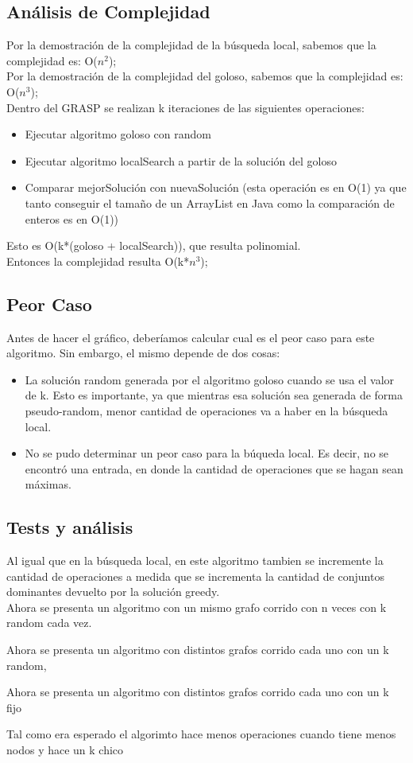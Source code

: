 \subsection{Análisis de Complejidad}
Por la demostración de la complejidad de la búsqueda local, sabemos que la complejidad es: O($n^2$);\\
Por la demostración de la complejidad del goloso, sabemos que la complejidad es: O($n^3$);\\
Dentro del GRASP se realizan k iteraciones de las siguientes operaciones:
\begin{itemize}
\item Ejecutar algoritmo goloso con random
\item Ejecutar algoritmo localSearch a partir de la solución del goloso
\item Comparar mejorSolución con nuevaSolución (esta operación es en O(1) ya que tanto conseguir el tamaño de un ArrayList en Java como la comparación de enteros es en O(1)) 
\end{itemize}
Esto es O(k*(goloso + localSearch)), que resulta polinomial.\\
Entonces la complejidad resulta O(k*$n^3$);

\subsection{Peor Caso}
Antes de hacer el gráfico, deberíamos calcular cual es el peor caso para este algoritmo. Sin embargo, el mismo depende de dos cosas:
\begin{itemize}
\item La solución random generada por el algoritmo goloso cuando se usa el valor de k. 	Esto es importante, ya que mientras esa solución sea generada de forma pseudo-random, menor cantidad
	de operaciones va a haber en la búsqueda local.
\item No se pudo determinar un peor caso para la búqueda local. Es decir, no se encontró una entrada, en donde la
	cantidad de operaciones que se hagan sean máximas.
\end{itemize}

\subsection{Tests y análisis}
Al igual que en la búsqueda local, en este algoritmo tambien se incremente la cantidad de operaciones a medida
que se incrementa la cantidad de conjuntos dominantes devuelto por la solución greedy.\\
Ahora se presenta un algoritmo con un mismo grafo corrido con n veces con k random cada vez.

Ahora se presenta un algoritmo con distintos grafos corrido cada uno con un k random, 

Ahora se presenta un algoritmo con distintos grafos corrido cada uno con un k fijo

Tal como era esperado el algorimto hace menos operaciones cuando tiene menos nodos y hace un k chico





